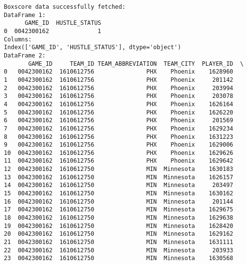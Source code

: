 \begin{verbatim}
Boxscore data successfully fetched:
DataFrame 1:
      GAME_ID  HUSTLE_STATUS
0  0042300162              1
Columns:
Index(['GAME_ID', 'HUSTLE_STATUS'], dtype='object')
DataFrame 2:
       GAME_ID     TEAM_ID TEAM_ABBREVIATION  TEAM_CITY  PLAYER_ID  \
0   0042300162  1610612756               PHX    Phoenix    1628960   
1   0042300162  1610612756               PHX    Phoenix     201142   
2   0042300162  1610612756               PHX    Phoenix     203994   
3   0042300162  1610612756               PHX    Phoenix     203078   
4   0042300162  1610612756               PHX    Phoenix    1626164   
5   0042300162  1610612756               PHX    Phoenix    1626220   
6   0042300162  1610612756               PHX    Phoenix     201569   
7   0042300162  1610612756               PHX    Phoenix    1629234   
8   0042300162  1610612756               PHX    Phoenix    1631223   
9   0042300162  1610612756               PHX    Phoenix    1629006   
10  0042300162  1610612756               PHX    Phoenix    1629626   
11  0042300162  1610612756               PHX    Phoenix    1629642   
12  0042300162  1610612750               MIN  Minnesota    1630183   
13  0042300162  1610612750               MIN  Minnesota    1626157   
14  0042300162  1610612750               MIN  Minnesota     203497   
15  0042300162  1610612750               MIN  Minnesota    1630162   
16  0042300162  1610612750               MIN  Minnesota     201144   
17  0042300162  1610612750               MIN  Minnesota    1629675   
18  0042300162  1610612750               MIN  Minnesota    1629638   
19  0042300162  1610612750               MIN  Minnesota    1628420   
20  0042300162  1610612750               MIN  Minnesota    1629162   
21  0042300162  1610612750               MIN  Minnesota    1631111   
22  0042300162  1610612750               MIN  Minnesota     203933   
23  0042300162  1610612750               MIN  Minnesota    1630568   


\end{verbatim}

